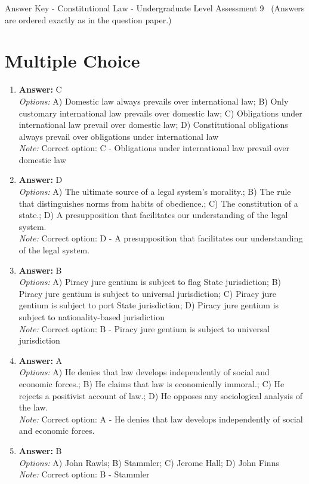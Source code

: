 \documentclass[12pt]{article}
\begin{document}
\begin{center}
Answer Key - Constitutional Law - Undergraduate Level Assessment 9 \
\small (Answers are ordered exactly as in the question paper.)
\end{center}

\section*{Multiple Choice}
\begin{enumerate}[label=\arabic*.]
\item \textbf{Answer:} C
\\ \textit{Options:} A) Domestic law always prevails over international law; B) Only customary international law prevails over domestic law; C) Obligations under international law prevail over domestic law; D) Constitutional obligations always prevail over obligations under international law
\\ \textit{Note:} Correct option: C - Obligations under international law prevail over domestic law
\item \textbf{Answer:} D
\\ \textit{Options:} A) The ultimate source of a legal system's morality.; B) The rule that distinguishes norms from habits of obedience.; C) The constitution of a state.; D) A presupposition that facilitates our understanding of the legal system.
\\ \textit{Note:} Correct option: D - A presupposition that facilitates our understanding of the legal system.
\item \textbf{Answer:} B
\\ \textit{Options:} A) Piracy jure gentium is subject to flag State jurisdiction; B) Piracy jure gentium is subject to universal jurisdiction; C) Piracy jure gentium is subject to port State jurisdiction; D) Piracy jure gentium is subject to nationality-based jurisdiction
\\ \textit{Note:} Correct option: B - Piracy jure gentium is subject to universal jurisdiction
\item \textbf{Answer:} A
\\ \textit{Options:} A) He denies that law develops independently of social and economic forces.; B) He claims that law is economically immoral.; C) He rejects a positivist account of law.; D) He opposes any sociological analysis of the law.
\\ \textit{Note:} Correct option: A - He denies that law develops independently of social and economic forces.
\item \textbf{Answer:} B
\\ \textit{Options:} A) John Rawls; B) Stammler; C) Jerome Hall; D) John Finns
\\ \textit{Note:} Correct option: B - Stammler
\end{enumerate}
\end{document}

